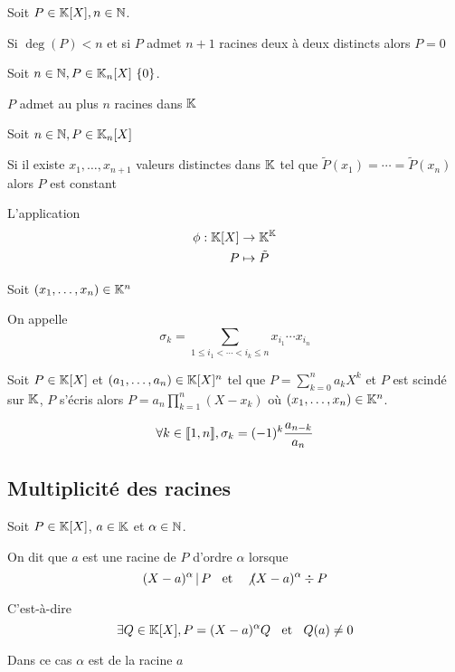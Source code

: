 \begin{cor}
  Soit $P \in \mathbb{K}[X], n \in \mathbb{N}$.

  Si $\deg(P) < n$ et si $P$ admet $n + 1$ racines deux à deux
  distincts alors $P = 0$
\end{cor}

\begin{cor}
  Soit $n \in \N, P \in \K_n[X] \\\ \{0\}$.

  $P$ admet au plus $n$ racines dans $\mathbb{K}$
\end{cor}

\begin{cor}
  Soit $n \in \mathbb{N}, P \in \mathbb{K}_n[X]$

  Si il existe $x_1, \ldots, x_{n + 1}$ valeurs distinctes dans $\mathbb{K}$ tel que
  $\tilde{P}(x_1) = \cdots = \tilde{P}(x_n)$ alors $P$ est constant
\end{cor}

\begin{cor}
  L'application
  \begin{align*}
    \phi : \mathbb{K}[X] &\to \mathbb{K}^{\mathbb{K}} \\
      P &\mapsto \tilde{P}
  \end{align*}
\end{cor}

\begin{dfn}
  Soit $(x_1, \ldots, x_n) \in \mathbb{K}^n$
  
  On appelle 
  \[
    \sigma_k = \sum_{1 \leq i_1 < \cdots < i_k \leq n} x_{i_1} \cdots x_{i_n}
  \]
\end{dfn}

\begin{prp}
  Soit $P \in \mathbb{K}[X]$ et $(a_1, \ldots, a_n) \in \mathbb{K}[X]^n$ tel que
  $P = \sum^n_{k = 0} a_k X^k$ et $P$ est scindé sur $\mathbb{K}$,
  $P$ s'écris alors $P = a_n \prod^n_{k = 1} (X - x_k)$ où
  $(x_1, \ldots, x_n) \in \mathbb{K}^n$.

  \[
    \forall k \in \llbracket 1, n \rrbracket, \sigma_k = (-1)^k \frac{a_{n - k}}{a_n}
  \]
\end{prp}


\subsection{Multiplicité des racines}

\begin{dfn}
  Soit $P \in \mathbb{K}[X]$, $a \in \mathbb{K}$ et $\alpha \in \mathbb{N}$.

  On dit que $a$ est une racine de $P$ d'ordre $\alpha$
  lorsque
  \[
    (X - a)^\alpha \operatorname{|} P \;\;\text{ et }\;\; \not (X - a)^\alpha \div P
  \]

  C'est-à-dire
  \[
    \exists Q \in \mathbb{K}[X], P = (X - a)^\alpha Q \;\;\text{ et }\;\; Q(a) \neq 0
  \]

  Dans ce cas $\alpha$ est  de la racine $a$
\end{dfn}

